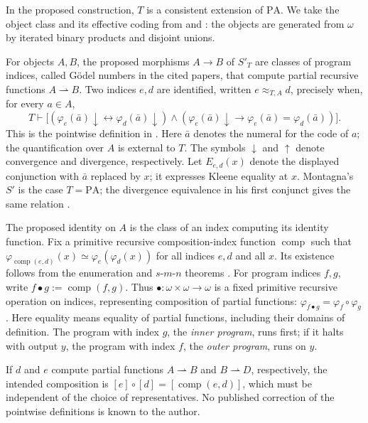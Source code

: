 \documentclass[11pt]{article}
\newcommand{\PA}{\mathrm{PA}}
\newcommand{\comp}{\operatorname{comp}}
\begin{document}
In the proposed construction, $T$ is a consistent extension of $\PA$.
We take the object class and its effective coding from
\cite[pp.~105--106]{Montagna} and
\cite[p.~646]{DiPaolaMontagna}: the objects are generated from
$\omega$ by iterated binary products and disjoint unions.

For objects $A,B$, the proposed morphisms $A\to B$ of $S'_T$ are
classes of program indices, called G\"odel numbers in the cited papers,
that compute partial recursive functions $A\rightharpoonup B$.
Two indices $e,d$ are identified,
written $e\approx_{T,A}d$, precisely when, for every $a\in A$,
\begin{equation*}
 T\vdash
 \bigl[(\varphi_e(\bar a)\downarrow
          \leftrightarrow\varphi_d(\bar a)\downarrow)
 \land
 (\varphi_e(\bar a)\downarrow
          \to\varphi_e(\bar a)=\varphi_d(\bar a))\bigr].
\end{equation*}
This is the pointwise definition in \cite[p.~646]{DiPaolaMontagna}.
Here $\bar a$ denotes the numeral for the code of $a$; the quantification
over $A$ is external to $T$.
The symbols $\downarrow$ and $\uparrow$ denote convergence and
divergence, respectively.
Let $E_{e,d}(x)$ denote the displayed conjunction with $\bar a$ replaced
by $x$; it expresses Kleene equality at $x$.
Montagna's $S'$ is the case $T=\PA$; the divergence equivalence in
his first conjunct gives the same relation
\cite[p.~106]{Montagna}.

The proposed identity on $A$ is the class of an index computing its identity
function. Fix a primitive recursive composition-index function $\comp$ such
that $\varphi_{\comp(e,d)}(x)\simeq\varphi_e(\varphi_d(x))$ for all indices
$e,d$ and all $x$. Its existence follows from the enumeration and
$s$-$m$-$n$ theorems \cite[Theorem~II.1.5 and Proposition~II.1.7, pp.~130--131]{Odifreddi}.
For program indices $f,g$, write $f\bullet g:=\comp(f,g)$.
Thus $\bullet:\omega\times\omega\to\omega$ is a fixed primitive
recursive operation on indices, representing composition of partial
functions: $\varphi_{f\bullet g}=\varphi_f\circ\varphi_g$.
Here equality means equality of partial functions, including their domains
of definition. The program with index $g$, the \emph{inner program},
runs first; if it halts with output $y$, the program with index $f$,
the \emph{outer program}, runs on $y$.

If $d$ and $e$ compute partial functions
$A\rightharpoonup B$ and $B\rightharpoonup D$, respectively, the intended
composition is $[e]\circ[d]=[\comp(e,d)]$,
which must be independent of the choice of representatives.
No published correction of the pointwise definitions is known to the author.
\end{document}
